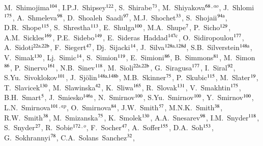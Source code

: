 \begin{flushleft}
M.~Shimojima$^\textrm{\scriptsize 104}$,
I.P.J.~Shipsey$^\textrm{\scriptsize 122}$,
S.~Shirabe$^\textrm{\scriptsize 73}$,
M.~Shiyakova$^\textrm{\scriptsize 68}$$^{,ao}$,
J.~Shlomi$^\textrm{\scriptsize 175}$,
A.~Shmeleva$^\textrm{\scriptsize 98}$,
D.~Shoaleh~Saadi$^\textrm{\scriptsize 97}$,
M.J.~Shochet$^\textrm{\scriptsize 33}$,
S.~Shojaii$^\textrm{\scriptsize 94a}$,
D.R.~Shope$^\textrm{\scriptsize 115}$,
S.~Shrestha$^\textrm{\scriptsize 113}$,
E.~Shulga$^\textrm{\scriptsize 100}$,
M.A.~Shupe$^\textrm{\scriptsize 7}$,
P.~Sicho$^\textrm{\scriptsize 129}$,
A.M.~Sickles$^\textrm{\scriptsize 169}$,
P.E.~Sidebo$^\textrm{\scriptsize 149}$,
E.~Sideras~Haddad$^\textrm{\scriptsize 147c}$,
O.~Sidiropoulou$^\textrm{\scriptsize 177}$,
A.~Sidoti$^\textrm{\scriptsize 22a,22b}$,
F.~Siegert$^\textrm{\scriptsize 47}$,
Dj.~Sijacki$^\textrm{\scriptsize 14}$,
J.~Silva$^\textrm{\scriptsize 128a,128d}$,
S.B.~Silverstein$^\textrm{\scriptsize 148a}$,
V.~Simak$^\textrm{\scriptsize 130}$,
Lj.~Simic$^\textrm{\scriptsize 14}$,
S.~Simion$^\textrm{\scriptsize 119}$,
E.~Simioni$^\textrm{\scriptsize 86}$,
B.~Simmons$^\textrm{\scriptsize 81}$,
M.~Simon$^\textrm{\scriptsize 86}$,
P.~Sinervo$^\textrm{\scriptsize 161}$,
N.B.~Sinev$^\textrm{\scriptsize 118}$,
M.~Sioli$^\textrm{\scriptsize 22a,22b}$,
G.~Siragusa$^\textrm{\scriptsize 177}$,
I.~Siral$^\textrm{\scriptsize 92}$,
S.Yu.~Sivoklokov$^\textrm{\scriptsize 101}$,
J.~Sj\"{o}lin$^\textrm{\scriptsize 148a,148b}$,
M.B.~Skinner$^\textrm{\scriptsize 75}$,
P.~Skubic$^\textrm{\scriptsize 115}$,
M.~Slater$^\textrm{\scriptsize 19}$,
T.~Slavicek$^\textrm{\scriptsize 130}$,
M.~Slawinska$^\textrm{\scriptsize 42}$,
K.~Sliwa$^\textrm{\scriptsize 165}$,
R.~Slovak$^\textrm{\scriptsize 131}$,
V.~Smakhtin$^\textrm{\scriptsize 175}$,
B.H.~Smart$^\textrm{\scriptsize 5}$,
J.~Smiesko$^\textrm{\scriptsize 146a}$,
N.~Smirnov$^\textrm{\scriptsize 100}$,
S.Yu.~Smirnov$^\textrm{\scriptsize 100}$,
Y.~Smirnov$^\textrm{\scriptsize 100}$,
L.N.~Smirnova$^\textrm{\scriptsize 101}$$^{,ap}$,
O.~Smirnova$^\textrm{\scriptsize 84}$,
J.W.~Smith$^\textrm{\scriptsize 57}$,
M.N.K.~Smith$^\textrm{\scriptsize 38}$,
R.W.~Smith$^\textrm{\scriptsize 38}$,
M.~Smizanska$^\textrm{\scriptsize 75}$,
K.~Smolek$^\textrm{\scriptsize 130}$,
A.A.~Snesarev$^\textrm{\scriptsize 98}$,
I.M.~Snyder$^\textrm{\scriptsize 118}$,
S.~Snyder$^\textrm{\scriptsize 27}$,
R.~Sobie$^\textrm{\scriptsize 172}$$^{,o}$,
F.~Socher$^\textrm{\scriptsize 47}$,
A.~Soffer$^\textrm{\scriptsize 155}$,
D.A.~Soh$^\textrm{\scriptsize 153}$,
G.~Sokhrannyi$^\textrm{\scriptsize 78}$,
C.A.~Solans~Sanchez$^\textrm{\scriptsize 32}$,
$$
\end{flushleft}
